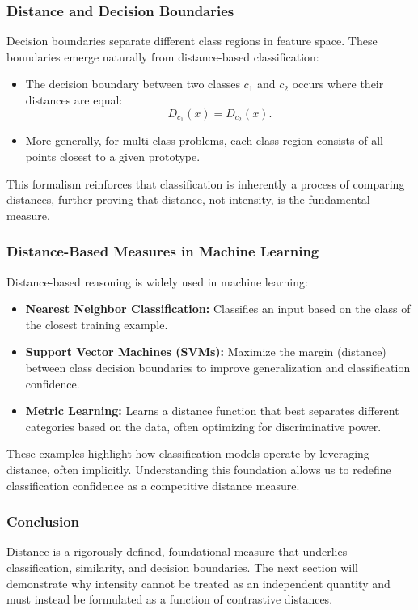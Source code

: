 \subsubsection{Distance and Decision Boundaries}

Decision boundaries separate different class regions in feature space. These boundaries emerge naturally from distance-based classification:

\begin{itemize}
    \item The decision boundary between two classes \( c_1 \) and \( c_2 \) occurs where their distances are equal:
    \[
        D_{c_1}(x) = D_{c_2}(x).
    \]
    \item More generally, for multi-class problems, each class region consists of all points closest to a given prototype.
\end{itemize}

This formalism reinforces that classification is inherently a process of comparing distances, further proving that distance, not intensity, is the fundamental measure.

\subsubsection{Distance-Based Measures in Machine Learning}

Distance-based reasoning is widely used in machine learning:

\begin{itemize}
    \item \textbf{Nearest Neighbor Classification:} Classifies an input based on the class of the closest training example.
    \item \textbf{Support Vector Machines (SVMs):} Maximize the margin (distance) between class decision boundaries to improve generalization and classification confidence.
    \item \textbf{Metric Learning:} Learns a distance function that best separates different categories based on the data, often optimizing for discriminative power.
\end{itemize}


These examples highlight how classification models operate by leveraging distance, often implicitly. Understanding this foundation allows us to redefine classification confidence as a competitive distance measure.

\subsubsection{Conclusion}

Distance is a rigorously defined, foundational measure that underlies classification, similarity, and decision boundaries. The next section will demonstrate why intensity cannot be treated as an independent quantity and must instead be formulated as a function of contrastive distances.
